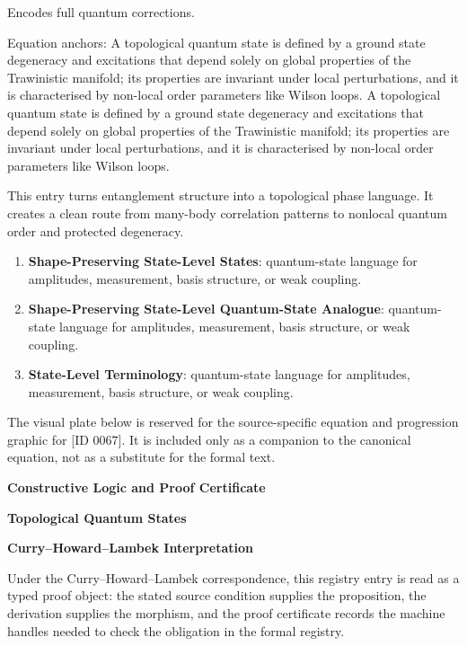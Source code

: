 Encodes full quantum corrections.

Equation anchors: A topological quantum state is defined by a ground state degeneracy and excitations that depend solely on global properties of the Trawinistic manifold; its properties are invariant under local perturbations, and it is characterised by non-local order parameters like Wilson loops. A topological quantum state is defined by a ground state degeneracy and excitations that depend solely on global properties of the Trawinistic manifold; its properties are invariant under local perturbations, and it is characterised by non-local order parameters like Wilson loops.

This entry turns entanglement structure into a topological phase language. It creates a clean route from many-body correlation patterns to nonlocal quantum order and protected degeneracy.
\endgroup

\begingroup\footnotesize\sloppy
\begin{enumerate}[leftmargin=1.35em,itemsep=1pt,topsep=1pt,parsep=0pt]
\item \textbf{Shape-Preserving State-Level States}: quantum-state language for amplitudes, measurement, basis structure, or weak coupling.
\item \textbf{Shape-Preserving State-Level Quantum-State Analogue}: quantum-state language for amplitudes, measurement, basis structure, or weak coupling.
\item \textbf{State-Level Terminology}: quantum-state language for amplitudes, measurement, basis structure, or weak coupling.
\end{enumerate}
\endgroup

\begingroup\footnotesize\sloppy
The visual plate below is reserved for the source-specific equation and progression graphic for [ID 0067]. It is included only as a companion to the canonical equation, not as a substitute for the formal text.
\par\endgroup
\ifTZPDarkEdition
{}
\fi

\clearpage
\begingroup\tzpsupportsetup
\noindent\textbf{\fontsize{10.8pt}{12.8pt}\selectfont [ID 0067] Constructive Logic and Proof Certificate}\par
\noindent\textbf{\fontsize{10pt}{12pt}\selectfont Topological Quantum States}\par
\vspace{0.45em}
\begingroup
\footnotesize
\setlength{\parskip}{0.22em}
\setlength{\parindent}{0pt}
\noindent\textbf{Curry--Howard--Lambek Interpretation}\par
Under the Curry--Howard--Lambek correspondence, this registry entry is read as a typed proof
object: the stated source condition supplies the proposition, the derivation supplies the
morphism, and the proof certificate records the machine handles needed to check the obligation
in the formal registry.

